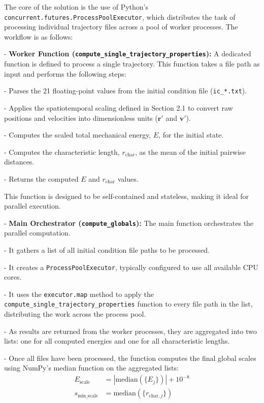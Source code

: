 \documentclass[11pt, a4paper]{article}
\begin{document}
The core of the solution is the use of Python's \texttt{concurrent.futures.ProcessPoolExecutor}, which distributes the task of processing individual trajectory files across a pool of worker processes. The workflow is as follows:

    
- \textbf{Worker Function (\texttt{compute\_single\_trajectory\_properties}):} A dedicated function is defined to process a single trajectory. This function takes a file path as input and performs the following steps:
    
        
- Parses the 21 floating-point values from the initial condition file (\texttt{ic\_*.txt}).
        
- Applies the spatiotemporal scaling defined in Section 2.1 to convert raw positions and velocities into dimensionless units ($\mathbf{r}'$ and $\mathbf{v}'$).
        
- Computes the scaled total mechanical energy, $E$, for the initial state.
        
- Computes the characteristic length, $r_{\text{char}}$, as the mean of the initial pairwise distances.
        
- Returns the computed $E$ and $r_{\text{char}}$ values.
    
    This function is designed to be self-contained and stateless, making it ideal for parallel execution.

    
- \textbf{Main Orchestrator (\texttt{compute\_globals}):} The main function orchestrates the parallel computation.
    
        
- It gathers a list of all initial condition file paths to be processed.
        
- It creates a \texttt{ProcessPoolExecutor}, typically configured to use all available CPU cores.
        
- It uses the \texttt{executor.map} method to apply the \texttt{compute\_single\_trajectory\_properties} function to every file path in the list, distributing the work across the process pool.
        
- As results are returned from the worker processes, they are aggregated into two lists: one for all computed energies and one for all characteristic lengths.
        
- Once all files have been processed, the function computes the final global scales using NumPy's median function on the aggregated lists:
        \begin{align}
            E_{\text{scale}} &= |\text{median}(\{E_j\})| + 10^{-8} \\
            s_{\text{min\_scale}} &= \text{median}(\{r_{\text{char},j}\})
        \end{align}
    
\end{document}
